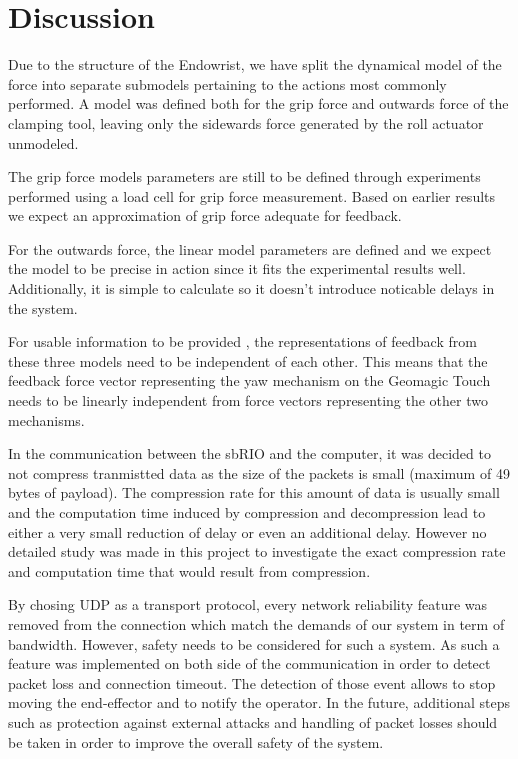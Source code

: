 \section{Discussion}
Due to the structure of the Endowrist, we have split the dynamical model of the force into separate submodels pertaining to the actions most commonly performed.
A model was defined both for the grip force and outwards force of the clamping tool, leaving only the sidewards force generated by the roll actuator unmodeled.

The grip force models parameters are still to be defined through experiments performed using a load cell for grip force measurement.
Based on earlier results \cite{kim2014dynamic} we expect an approximation of grip force adequate for feedback.

For the outwards force, the linear model parameters are defined and we expect the model to be precise in action since it fits the experimental results well.
Additionally, it is simple to calculate so it doesn't introduce noticable delays in the system.

For usable information to be provided , the representations of feedback from these three models need to be independent of each other.
This means that the feedback force vector representing the yaw mechanism on the Geomagic Touch needs to be linearly independent from force vectors representing the other two mechanisms.


In the communication between the sbRIO and the computer, it was decided to not compress tranmistted data as the size of the packets is small (maximum of 49 bytes of payload). The compression rate for this amount of data is usually small and the computation time induced by compression and decompression lead to either a very small reduction of delay or even an additional delay. However no detailed study was made in this project to investigate the exact compression rate and computation time that would result from compression.

By chosing UDP as a transport protocol, every network reliability feature was removed from the connection which match the demands of our system in term of bandwidth. However, safety needs to be considered for such a system. As such a feature was implemented on both side of the communication in order to detect packet loss and connection timeout. The detection of those event allows to stop moving the end-effector and to notify the operator. In the future, additional steps such as protection against external attacks and handling of packet losses should be taken in order to improve the overall safety of the system.
